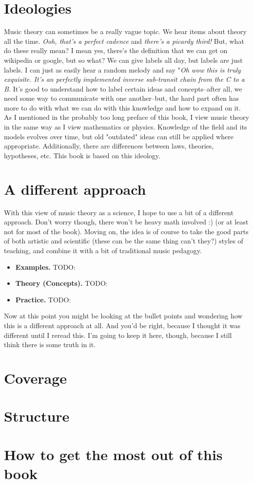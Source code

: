 \documentclass[../OpenAppliedMusicTheory.tex]{subfiles}
\begin{document}
    


    \section*{Ideologies}
    Music theory can sometimes be a really vague topic. We hear items about theory all the time. \emph{Ooh, that's a perfect cadence} and \emph{there's a picardy third!} But, what do these really mean? I mean yes, there's the definition that we can get on wikipedia or google, but so what? We can give labels all day, but labels are just labels. I can just as easily hear a random melody and say "\emph{Oh wow this is truly exquisite. It's an perfectly implemented inverse sub-transit chain from the C to a B.} It's good to understand how to label certain ideas and concepts--after all, we need some way to communicate with one another--but, the hard part often has more to do with what we can do with this knowledge and how to expand on it. As I mentioned in the probably too long preface of this book, I view music theory in the same way as I view mathematics or physics. Knowledge of the field and its models evolves over time, but old "outdated" ideas can still be applied where appropriate. Additionally, there are differences between laws, theories, hypotheses, etc. This book is based on this ideology. 

    \section*{A different approach}
    With this view of music theory as a science, I hope to use a bit of a different approach. Don't worry though, there won't be heavy math involved :) (or at least not for most of the book). Moving on, the idea is of course to take the good parts of both artistic and scientific (these can be the same thing can't they?) styles of teaching, and combine it with a bit of traditional music pedagogy.
    
    \begin{itemize}
        \item \textbf{Examples.} TODO:
        \item \textbf{Theory (Concepts).} TODO:
        \item \textbf{Practice.} TODO:
    \end{itemize}

    Now at this point you might be looking at the bullet points and wondering how this is a different approach at all. And you'd be right, because I thought it was different until I reread this. I'm going to keep it here, though, because I still think there is some truth in it.

    \section*{Coverage}

    \section*{Structure}

    \section*{How to get the most out of this book}
\end{document}
